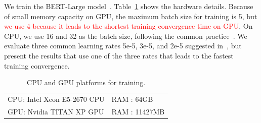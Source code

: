 

\textcolor{check}{
We train the BERT-Large model~\cite{devlin2018bert}.  Table~\ref{tab:hw_gpu} shows the hardware details. 
Because of small memory capacity on GPU, the maximum batch size for training is 5, but \textcolor{red}{we use 4 because it leads to the shortest training convergence time on GPU}. On CPU, we use 16 and 32 as the batch size, following the common practice~\cite{devlin2018bert}. We evaluate three common learning rates 5e-5, 3e-5, and 2e-5 suggested in~\cite{devlin2018bert}, but present the results that use one of the three rates that leads to the fastest training convergence.}


\begin{table}[t]
\centering
\caption{\textcolor{check}{CPU and GPU platforms for training.}}
\vspace{-5pt}
\begin{tabular}{ll}
\hline
CPU: Intel Xeon E5-2670 CPU & RAM : 64GB\\ %
GPU: Nvidia TITAN XP GPU & RAM : 11427MB\\
\hline
\end{tabular}
\vspace{-5pt}
\label{tab:hw_gpu}
\end{table}

